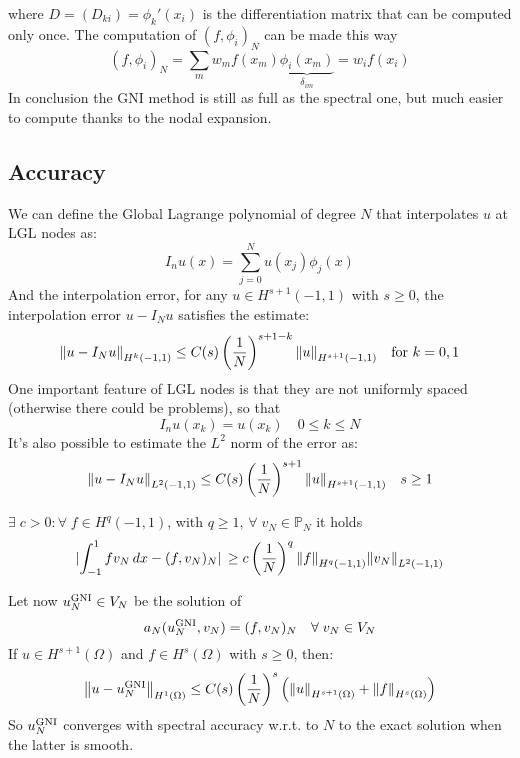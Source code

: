 where \(D = (D_{ki}) = \phi_k'(x_i)\) is the differentiation matrix that can be computed only once. The computation of \((f,\phi_i)_N\) can be made this way 
\[
    (f, \phi_i)_N = \sum_m w_m f(x_m)\underbrace{\phi_i(x_m)}_{\delta_{im}} = w_i f(x_i) 
\]
In conclusion the GNI method is still as full as the spectral one, but much easier to compute thanks to the nodal expansion.
\subsection*{Accuracy}
We can define the Global Lagrange polynomial of degree \(N\) that interpolates \(u\) at LGL nodes as:
\[
    I_nu(x) = \sum_{j=0}^{N}u(x_j)\phi_j(x)
\]
And the interpolation error, for any \(u \in H^{s+1}(-1, 1)\) with \(s \geq 0 \), the interpolation error \(u - I_N u\) satisfies the estimate:
\[
    \norm{u-I_Nu}_{H^k(-1,1)} \leq C(s)\left(\frac{1}{N}\right)^{s+1-k}\norm{u}_{H^{s+1}(-1,1)} \quad \text{for }k = 0,1
\]
One important feature of LGL nodes is that they are not uniformly spaced (otherwise there could be problems), so that 
\[
    I_nu(x_k) = u(x_k) \quad 0 \leq k \leq N
\]
It's also possible to estimate the \(L^2\) norm of the error as:
\[
    \norm{u - I_N u}_{L^2(-1,1)} \leq C(s) \left(\frac{1}{N}\right)^{s+1} \norm{u}_{H^{s+1}(-1,1)} \quad s \geq 1
\]
\begin{theorem}
    \(\exists \; c > 0 : \forall \; f \in H^q(-1,1)\), with \(q \geq 1\), \(\forall \; v_N \in \mathbb{P}_N\) it holds 
    \[
        \abs*{\int_{-1}^1 f v_N \, dx - (f, v_N)_N} \geq c \left(\frac{1}{N}\right)^q \norm{f}_{H^q(-1,1)} \norm{v_N}_{L^2(-1,1)}
    \]
\end{theorem}
Let now \(u_N^{\text{GNI}} \in V_N\) be the solution of
\[
     a_N(u_N^{\text{GNI}}, v_N) = (f, v_N)_N \quad \forall \; v_N \in V_N
\]
If \(u \in H^{s+1}(\Omega)\) and \(f \in H^{s}(\Omega)\) with \(s \geq 0\), then:
\[
    \norm{u-u_N^{\text{GNI}}}_{H^1(\Omega)} \leq C(s) \left(\frac{1}{N}\right)^s \left(\norm{u}_{H^{s+1}(\Omega)}+\norm{f}_{H^s(\Omega)}\right)
\]
So \(u_N^{\text{GNI}}\) converges with spectral accuracy w.r.t. to \(N\) to the exact solution when the latter is smooth.

